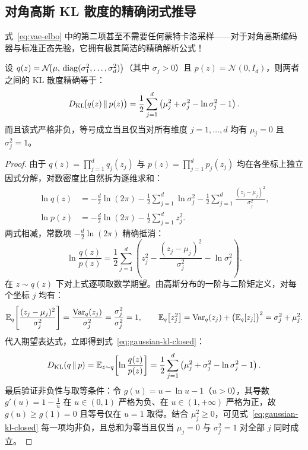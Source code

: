 \subsection{对角高斯 KL 散度的精确闭式推导}

式~\eqref{eq:vae-elbo} 中的第二项甚至不需要任何蒙特卡洛采样——对于对角高斯编码器与标准正态先验，它拥有极其简洁的精确解析公式！

\begin{thmBox}
\begin{theorem}[对角高斯与标准正态分布的闭式 KL 散度]
\label{thm:gaussian-kl}
设 $q(z) = \mathcal{N}\!\big(\mu,\, \operatorname{diag}(\sigma_1^2, \dots, \sigma_d^2)\big)$（其中 $\sigma_j > 0$）且 $p(z) = \mathcal{N}(0, I_d)$，则两者之间的 KL 散度精确等于：
\begin{equation}
  D_{\mathrm{KL}}\!\big(q(z) \,\|\, p(z)\big)
  = \frac{1}{2} \sum_{j=1}^{d} \left(\mu_j^2 + \sigma_j^2 - \ln \sigma_j^2 - 1\right).
  \label{eq:gaussian-kl-closed}
\end{equation}
而且该式严格非负，等号成立当且仅当对所有维度 $j = 1, \dots, d$ 均有 $\mu_j = 0$ 且 $\sigma_j^2 = 1$。
\end{theorem}
\begin{proof}
由于 $q(z) = \prod_{j=1}^d q_j(z_j)$ 与 $p(z) = \prod_{j=1}^d p_j(z_j)$ 均在各坐标上独立因式分解，对数密度比自然拆为逐维求和：
\begin{align*}
  \ln q(z) &= -\frac{d}{2}\ln(2\pi) - \frac{1}{2}\sum_{j=1}^{d} \ln\sigma_j^2 - \frac{1}{2}\sum_{j=1}^{d} \frac{(z_j - \mu_j)^2}{\sigma_j^2}, \\
  \ln p(z) &= -\frac{d}{2}\ln(2\pi) - \frac{1}{2}\sum_{j=1}^{d} z_j^2.
\end{align*}
两式相减，常数项 $-\frac{d}{2}\ln(2\pi)$ 精确抵消：
\[
  \ln \frac{q(z)}{p(z)} = \frac{1}{2} \sum_{j=1}^{d} \left(z_j^2 - \frac{(z_j - \mu_j)^2}{\sigma_j^2} - \ln\sigma_j^2\right).
\]
在 $z \sim q(z)$ 下对上式逐项取数学期望。由高斯分布的一阶与二阶矩定义，对每个坐标 $j$ 均有：
\[
  \mathbb{E}_{q}\!\left[\frac{(z_j - \mu_j)^2}{\sigma_j^2}\right] = \frac{\operatorname{Var}_{q}(z_j)}{\sigma_j^2} = \frac{\sigma_j^2}{\sigma_j^2} = 1,
  \qquad
  \mathbb{E}_{q}\!\left[z_j^2\right] = \operatorname{Var}_{q}(z_j) + \big(\mathbb{E}_{q}[z_j]\big)^2 = \sigma_j^2 + \mu_j^2.
\]
代入期望表达式，立即得到式~\eqref{eq:gaussian-kl-closed}：
\[
  D_{\mathrm{KL}}(q \,\|\, p)
  = \mathbb{E}_{z \sim q}\!\left[\ln \frac{q(z)}{p(z)}\right]
  = \frac{1}{2}\sum_{j=1}^{d}\left(\mu_j^2 + \sigma_j^2 - \ln\sigma_j^2 - 1\right).
\]
最后验证非负性与取等条件：令 $g(u) = u - \ln u - 1$（$u > 0$），其导数 $g'(u) = 1 - \frac{1}{u}$ 在 $u \in (0, 1)$ 严格为负、在 $u \in (1, +\infty)$ 严格为正，故 $g(u) \ge g(1) = 0$ 且等号仅在 $u = 1$ 取得。结合 $\mu_j^2 \ge 0$，可见式~\eqref{eq:gaussian-kl-closed} 每一项均非负，且总和为零当且仅当 $\mu_j = 0$ 与 $\sigma_j^2 = 1$ 对全部 $j$ 同时成立。
\end{proof}
\end{thmBox}

